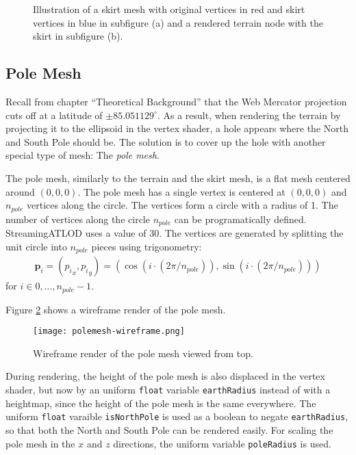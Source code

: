 \begin{figure}[H]
  \centering
  \qquad
  \caption{Illustration of a skirt mesh with original vertices in red and skirt vertices in blue in subfigure (a) and a rendered terrain node with the skirt in subfigure (b).}\label{fig:skirt}
\end{figure}

\subsection{Pole Mesh}
Recall from chapter ``Theoretical Background'' that the Web Mercator projection cuts off at a latitude of $\pm 85.051129^{\circ}$.
As a result, when rendering the terrain by projecting it to the ellipsoid in the vertex shader, 
a hole appears where the North and South Pole should be. The 
solution is to cover up the hole with another special type of mesh: The \textit{pole mesh}.

The pole mesh, similarly to the terrain and the skirt mesh, is a flat mesh centered around $(0,0,0)$.  
The pole mesh has a single vertex is centered at $(0,0,0)$ and $n_{pole}$ vertices along the circle.
The vertices form a circle with a radius of 1.
The number of vertices along the circle $n_{pole}$ can be programatically defined. StreamingATLOD uses a value of 30.
The vertices are generated by splitting the unit circle into $n_{pole}$ pieces using trigonometry:
\begin{align*}
  \mathbf{p}_i = ({p_i}_x, {p_i}_y) = (\cos(i \cdot (2 \pi / n_{pole})), \sin(i \cdot (2 \pi / n_{pole})))
\end{align*}
for $i \in 0, \dots, n_{pole} - 1$.

Figure \ref{fig:polemesh-wireframe} shows a wireframe render of the pole mesh.

\begin{figure}[H]
  \centering
  \texttt{[image: polemesh-wireframe.png]}
  \caption{Wireframe render of the pole mesh viewed from top.}\label{fig:polemesh-wireframe}
\end{figure}

During rendering, the height of the pole mesh is also displaced in the vertex shader, 
but now by an uniform \texttt{float} variable \texttt{earthRadius} 
instead of with a heightmap, since the height of the pole mesh 
is the same everywhere. The uniform \texttt{float} varaible \texttt{isNorthPole} is used 
as a boolean to negate \texttt{earthRadius}, so that both the North and South Pole can be rendered easily.
For scaling the pole mesh in the $x$ and $z$ directions, the uniform variable \texttt{poleRadius} is used.

